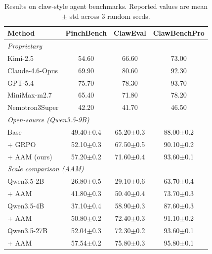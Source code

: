 \documentclass[letterpaper]{article} %
\begin{document}
\providecommand{\err}[1]{{\scriptsize\color{gray}$\pm$#1}}

\begin{table}[th]
    \centering
    \small
    \begin{tabular}{l c c c}
        \toprule
        Method & PinchBench & ClawEval & ClawBenchPro \\
        \midrule
        \multicolumn{4}{l}{\textit{Proprietary}} \\
        Kimi-2.5          & 54.60 & 66.60 & 73.00 \\
        Claude-4.6-Opus   & 69.90 & 80.60 & 92.30 \\
        GPT-5.4           & 75.70 & 78.30 & 93.70 \\
        MiniMax-m2.7      & 65.40 & 71.80 & 78.20 \\
        Nemotron3Super    & 42.20 & 41.70 & 46.50 \\
        \midrule
        \multicolumn{4}{l}{\textit{Open-source (Qwen3.5-9B)}} \\
        \rowcolor{gray!10} Base     & 49.40\err{0.4} & 65.20\err{0.3} & 88.00\err{0.2} \\
        \hspace{2pt} + GRPO         & 52.10\err{0.3} & 67.50\err{0.5} & 90.10\err{0.2} \\
        \hspace{2pt} + AAM (ours)   & 57.20\err{0.2} & 71.60\err{0.4} & 93.60\err{0.1} \\
        \midrule
        \multicolumn{4}{l}{\textit{Scale comparison (AAM)}} \\
        \rowcolor{gray!10} Qwen3.5-2B     & 26.80\err{0.5} & 29.10\err{0.6} & 63.70\err{0.4} \\
        \hspace{2pt} + AAM               & 41.80\err{0.3} & 50.40\err{0.4} & 73.70\err{0.3} \\
        \rowcolor{gray!10} Qwen3.5-4B     & 37.10\err{0.4} & 58.90\err{0.3} & 87.60\err{0.3} \\
        \hspace{2pt} + AAM               & 50.80\err{0.2} & 72.40\err{0.3} & 91.10\err{0.2} \\
        \rowcolor{gray!10} Qwen3.5-27B    & 52.04\err{0.3} & 72.30\err{0.2} & 93.60\err{0.1} \\
        \hspace{2pt} + AAM               & 57.54\err{0.2} & 75.80\err{0.3} & 95.80\err{0.1} \\
        \bottomrule
    \end{tabular}
    \caption{Results on claw-style agent benchmarks. Reported values are mean $\pm$ std across 3 random seeds.}
    \label{tab:main_claw}
\end{table}
\end{document}
